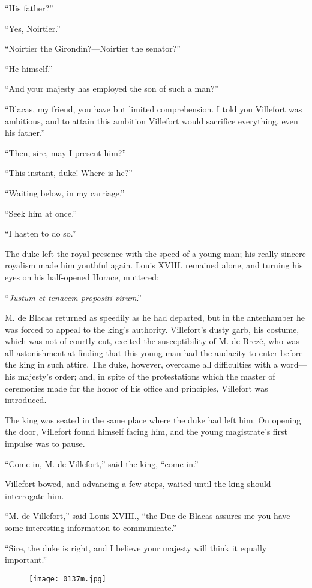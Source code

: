 “His father?”

“Yes, Noirtier.”

“Noirtier the Girondin?—Noirtier the senator?”

“He himself.”

“And your majesty has employed the son of such a man?”

“Blacas, my friend, you have but limited comprehension. I told you
Villefort was ambitious, and to attain this ambition Villefort would
sacrifice everything, even his father.”

“Then, sire, may I present him?”

“This instant, duke! Where is he?”

“Waiting below, in my carriage.”

“Seek him at once.”

“I hasten to do so.”

The duke left the royal presence with the speed of a young man; his
really sincere royalism made him youthful again. Louis XVIII. remained
alone, and turning his eyes on his half-opened Horace, muttered:

“\textit{Justum et tenacem propositi virum}.”

M. de Blacas returned as speedily as he had departed, but in the
antechamber he was forced to appeal to the king’s authority.
Villefort’s dusty garb, his costume, which was not of courtly cut,
excited the susceptibility of M. de Brezé, who was all astonishment at
finding that this young man had the audacity to enter before the king
in such attire. The duke, however, overcame all difficulties with a
word—his majesty’s order; and, in spite of the protestations which the
master of ceremonies made for the honor of his office and principles,
Villefort was introduced.

The king was seated in the same place where the duke had left him. On
opening the door, Villefort found himself facing him, and the young
magistrate’s first impulse was to pause.

“Come in, M. de Villefort,” said the king, “come in.”

Villefort bowed, and advancing a few steps, waited until the king
should interrogate him.

“M. de Villefort,” said Louis XVIII., “the Duc de Blacas assures me you
have some interesting information to communicate.”

“Sire, the duke is right, and I believe your majesty will think it
equally important.”

\begin{figure}[h]
\texttt{[image: 0137m.jpg]}
\end{figure}

